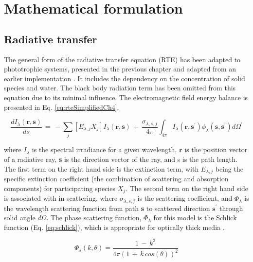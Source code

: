 
\newpage
\section{Mathematical formulation}
\label{S:formulation}
\subsection{Radiative transfer}
The general form of the radiative transfer equation (RTE) has been adapted to phototrophic systems, presented in the previous chapter and adapted from an earlier implementation \cite{kong2014}. 
It includes the dependency on the concentration of solid species and water. 
The black body radiation term has been omitted from this equation due to its minimal influence. 
The electromagnetic field energy balance is presented in Eq. \eqref{eq:rteSimplifiedCh4}. 

\begin{equation}
\frac{dI_\lambda (\textbf{r}, \textbf{s})}{ds} \, = \, - \sum_{j} [E_{\lambda,j} X_j] I_\lambda (\textbf{r}, \textbf{s})\, +\, \frac{\sigma_{\lambda, s, j}}{4 \pi} \int_{4 \pi} I_\lambda (\textbf{r}, \textbf{s}^\prime) \phi_\lambda(\textbf{s}, \textbf{s}^\prime) d\Omega^\prime
\label{eq:rteSimplifiedCh4}
    \end{equation}

where $I_\lambda$ is the spectral irradiance for a given wavelength, \textbf{r} is the position vector of a radiative ray, \textbf{s} is the direction vector of the ray, and s is the path length. The first term on the right hand side is the extinction term, with $E_{\lambda, j}$ being the specific extinction coefficient (the combination of scattering and absorption components) for participating species $X_j$. The second term on the right hand side is associated with in-scattering, where $\sigma_{\lambda, s, j}$ is the scattering coefficient, and $\Phi_\lambda$ is the wavelength scattering function from path \textbf{s} to scattered direction $\textbf{s}^\prime$ through solid angle $d\Omega$. The phase scattering function, $\Phi_\lambda$ for this model is the Schlick function (Eq. \ref{eq:schlick}), which is appropriate for optically thick media \cite{jarosz2008}. 

\begin{equation}
\Phi_s(k, \theta) = \frac{1 \, -\,  k^2}{4\pi (1\, +\,k\, cos(\theta))^2 }
\end{equation}

